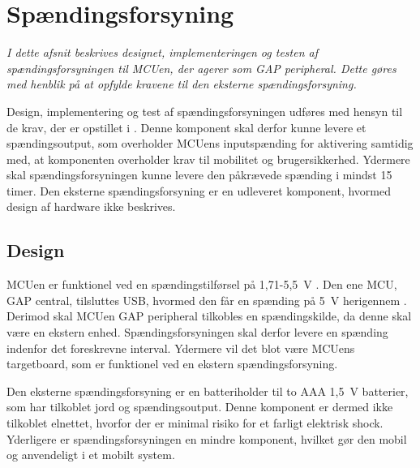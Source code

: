 \section{Spændingsforsyning}\label{spaendingsforsyning}
\textit{I dette afsnit beskrives designet, implementeringen og testen af spændingsforsyningen til MCUen, der agerer som GAP peripheral. Dette gøres med henblik på at opfylde kravene til den eksterne spændingsforsyning.}

Design, implementering og test af spændingsforsyningen udføres med hensyn til de krav, der er opstillet i . \newline
Denne komponent skal derfor kunne levere et spændingsoutput, som overholder MCUens inputspænding for aktivering samtidig med, at komponenten overholder krav til mobilitet og brugersikkerhed. Ydermere skal spændingsforsyningen kunne levere den påkrævede spænding i mindst 15 timer. \newline
Den eksterne spændingsforsyning er en udleveret komponent, hvormed design af hardware ikke beskrives. 

\subsection{Design}
MCUen er funktionel ved en spændingstilførsel på 1,71-5,5~V \citep{Semiconductor20164200M,Semiconductor2016PRoC}. Den ene MCU, GAP central, tilsluttes USB, hvormed den får en spænding på 5~V herigennem \citep{Semiconductor2016}. Derimod skal MCUen GAP peripheral tilkobles en spændingskilde, da denne skal være en ekstern enhed. Spændingsforsyningen skal derfor levere en spænding indenfor det foreskrevne interval. Ydermere vil det blot være MCUens targetboard, som er funktionel ved en ekstern spændingsforsyning.

Den eksterne spændingsforsyning er en batteriholder til to AAA 1,5~V batterier, som har tilkoblet jord og spændingsoutput. Denne komponent er dermed ikke tilkoblet elnettet, hvorfor der er minimal risiko for et farligt elektrisk shock. Yderligere er spændingsforsyningen en mindre komponent, hvilket gør den mobil og anvendeligt i et mobilt system.

